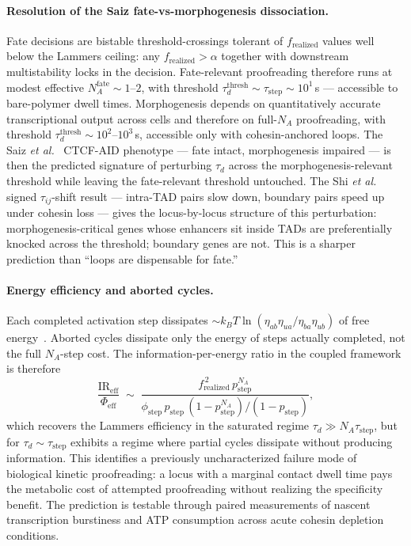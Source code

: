 \documentclass[11pt]{article}
\begin{document}
\paragraph{Resolution of the Saiz fate-vs-morphogenesis dissociation.}
Fate decisions are bistable threshold-crossings tolerant of
$f_{\mathrm{realized}}$ values well below the Lammers ceiling: any
$f_{\mathrm{realized}}>\alpha$ together with downstream multistability
locks in the decision. Fate-relevant proofreading therefore runs at
modest effective $N_A^{\mathrm{fate}}\sim 1$--$2$, with threshold
$\tau_d^{\mathrm{thresh}}\sim\tau_{\mathrm{step}}\sim 10^{1}$\,s ---
accessible to bare-polymer dwell times. Morphogenesis depends on
quantitatively accurate transcriptional output across cells and therefore
on full-$N_A$ proofreading, with threshold
$\tau_d^{\mathrm{thresh}}\sim 10^{2}$--$10^{3}$\,s, accessible only with
cohesin-anchored loops. The Saiz \textit{et al.}~\cite{Saiz2026}
CTCF-AID phenotype --- fate intact, morphogenesis impaired --- is then
the predicted signature of perturbing $\tau_d$ across the
morphogenesis-relevant threshold while leaving the fate-relevant
threshold untouched. The Shi \textit{et al.}~\cite{Shi2025} signed
$\tau_{ij}$-shift result --- intra-TAD pairs slow down, boundary pairs
speed up under cohesin loss --- gives the locus-by-locus structure of
this perturbation: morphogenesis-critical genes whose enhancers sit
inside TADs are preferentially knocked across the threshold; boundary
genes are not. This is a sharper prediction than ``loops are dispensable
for fate.''

\paragraph{Energy efficiency and aborted cycles.} Each completed
activation step dissipates $\sim k_BT\ln(\eta_{ab}\eta_{ua}/\eta_{ba}\eta_{ub})$
of free energy~\cite{Lammers2023}. Aborted cycles dissipate only the
energy of steps actually completed, not the full $N_A$-step cost. The
information-per-energy ratio in the coupled framework is therefore
\begin{equation}
  \frac{\mathrm{IR}_{\mathrm{eff}}}{\Phi_{\mathrm{eff}}}
  \;\sim\;
  \frac{f_{\mathrm{realized}}^{\,2}\,p_{\mathrm{step}}^{N_A}}
       {\phi_{\mathrm{step}}\,p_{\mathrm{step}}\,(1-p_{\mathrm{step}}^{N_A})/(1-p_{\mathrm{step}})},
  \label{eq:efficiency}
\end{equation}
which recovers the Lammers efficiency in the saturated regime
$\tau_d\gg N_A\tau_{\mathrm{step}}$, but for $\tau_d\sim
\tau_{\mathrm{step}}$ exhibits a regime where partial cycles dissipate
without producing information. This identifies a previously
uncharacterized failure mode of biological kinetic proofreading: a
locus with a marginal contact dwell time pays the metabolic cost of
attempted proofreading without realizing the specificity benefit. The
prediction is testable through paired measurements of nascent
transcription burstiness and ATP consumption across acute cohesin
depletion conditions.
\end{document}
